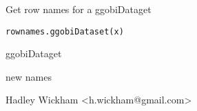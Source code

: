 \begin{Description}\relax
Get row names for a ggobiDataget
\end{Description}
\begin{Usage}
\begin{verbatim}rownames.ggobiDataset(x)\end{verbatim}
\end{Usage}
\begin{Arguments}
\begin{ldescription}
\item[\code{x}] ggobiDataget
\item[\code{}] 
\end{ldescription}
{new names}
\end{Arguments}
\begin{Details}\relax
\end{Details}
\begin{Author}\relax
Hadley Wickham <h.wickham@gmail.com>
\end{Author}
\begin{Examples}
\begin{ExampleCode}\end{ExampleCode}
\end{Examples}

